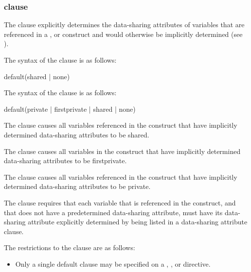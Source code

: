 \subsubsection{ clause}
\label{subsubsec:default clause}
\summary
The  clause explicitly determines the data-sharing attributes of variables that 
are referenced in a ,  or  construct and would otherwise be 
implicitly determined (see 
).

\syntax
\ccppspecificstart
The syntax of the  clause is as follows:

\begin{boxedcode}
default(shared \textnormal{|} none)
\end{boxedcode}
\ccppspecificend

\fortranspecificstart
The syntax of the  clause is as follows:

\begin{boxedcode}
default(private \textnormal{|} firstprivate \textnormal{|} shared \textnormal{|} none)
\end{boxedcode}
\fortranspecificend

\descr
The  clause causes all variables referenced in the construct that 
have implicitly determined data-sharing attributes to be shared.

\fortranspecificstart
The  clause causes all variables in the construct that have 
implicitly determined data-sharing attributes to be firstprivate.

The  clause causes all variables referenced in the construct that 
have implicitly determined data-sharing attributes to be private.
\fortranspecificend

The  clause requires that each variable that is referenced in the 
construct, and that does not have a predetermined data-sharing attribute, must have its 
data-sharing attribute explicitly determined by being listed in a data-sharing attribute 
clause. 

\restrictions
The restrictions to the  clause are as follows:

\begin{itemize}
\item Only a single default clause may be specified on a , , or  
directive. 
\end{itemize}









